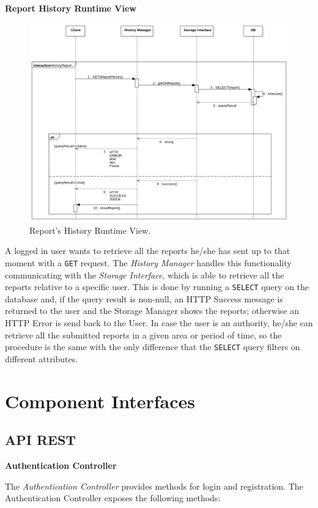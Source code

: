 \documentclass{report}
\begin{document}
\begin{center}\large{\textbf{Report History Runtime View}}\end{center}
\begin{figure}[H]
	\begin{center}
	\includegraphics[width=.9\textwidth]{img/HistoryReport.png}
    \end{center}
    \label{fig:HistoryReportSD}
	\caption{Report's History Runtime View.}
\end{figure}
A logged in user wants to retrieve all the reports he/she has sent up to that moment with a \texttt{GET} request. The \textit{History Manager} handles this functionality communicating with the \textit{Storage Interface}, which is able to retrieve all the reports relative to a specific user. This is done by running a \texttt{SELECT} query on the database and, if the query result is non-null, an HTTP Success message is returned to the user and the Storage Manager shows the reports; otherwise an HTTP Error is send back to the User.
In case the user is an authority, he/she can retrieve all the submitted reports in a given area or period of time, so the procedure is the same with the only difference that the \texttt{SELECT} query filters on different attributes.  
\clearpage
\section{Component Interfaces}
\subsection{API REST}
\begin{center}\large{\textbf{Authentication Controller}}\end{center}
The \textit{Authentication Controller} provides methods for login and registration.
The Authentication Controller exposes the following methods: \\
\end{document}
